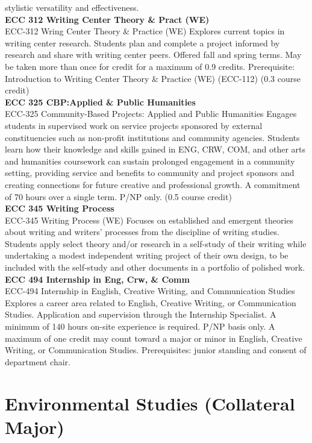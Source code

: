 \documentclass[
  letterpaper,
]{scrbook}
\begin{document}
stylistic versatility and effectiveness.\\
\textbf{ECC 312 Writing Center Theory \& Pract (WE)}\\
ECC-312 Wring Center Theory \& Practice (WE) Explores current topics in
writing center research. Students plan and complete a project informed
by research and share with writing center peers. Offered fall and spring
terms. May be taken more than once for credit for a maximum of 0.9
credits. Prerequisite: Introduction to Writing Center Theory \& Practice
(WE) (ECC-112) (0.3 course credit)\\
\textbf{ECC 325 CBP:Applied \& Public Humanities}\\
ECC-325 Community-Based Projects: Applied and Public Humanities Engages
students in supervised work on service projects sponsored by external
constituencies such as non-profit institutions and community agencies.
Students learn how their knowledge and skills gained in ENG, CRW, COM,
and other arts and humanities coursework can sustain prolonged
engagement in a community setting, providing service and benefits to
community and project sponsors and creating connections for future
creative and professional growth. A commitment of 70 hours over a single
term. P/NP only. (0.5 course credit)\\
\textbf{ECC 345 Writing Process}\\
ECC-345 Writing Process (WE) Focuses on established and emergent
theories about writing and writers' processes from the discipline of
writing studies. Students apply select theory and/or research in a
self-study of their writing while undertaking a modest independent
writing project of their own design, to be included with the self-study
and other documents in a portfolio of polished work.\\
\textbf{ECC 494 Internship in Eng, Crw, \& Comm}\\
ECC-494 Internship in English, Creative Writing, and Communication
Studies Explores a career area related to English, Creative Writing, or
Communication Studies. Application and supervision through the
Internship Specialist. A minimum of 140 hours on-site experience is
required. P/NP basis only. A maximum of one credit may count toward a
major or minor in English, Creative Writing, or Communication Studies.
Prerequisites: junior standing and consent of department chair.

\section{Environmental Studies (Collateral
Major)}\label{environmental-studies-collateral-major}
\end{document}
